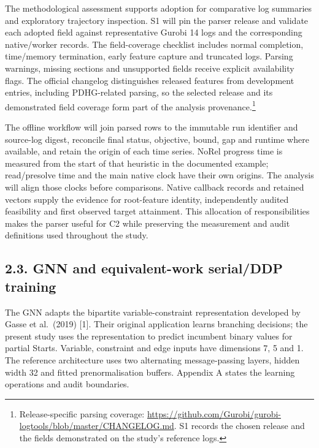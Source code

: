 \documentclass[
  british,
  10pt,
]{article}
\begin{document}
The methodological assessment supports adoption for comparative log
summaries and exploratory trajectory inspection. S1 will pin the parser
release and validate each adopted field against representative Gurobi 14
logs and the corresponding native/worker records. The field-coverage
checklist includes normal completion, time/memory termination, early
feature capture and truncated logs. Parsing warnings, missing sections
and unsupported fields receive explicit availability flags. The official
changelog distinguishes released features from development entries,
including PDHG-related parsing, so the selected release and its
demonstrated field coverage form part of the analysis
provenance.\footnote{Release-specific parsing coverage:
  \url{https://github.com/Gurobi/gurobi-logtools/blob/master/CHANGELOG.md}.
  S1 records the chosen release and the fields demonstrated on the
  study's reference logs.}

The offline workflow will join parsed rows to the immutable run
identifier and source-log digest, reconcile final status, objective,
bound, gap and runtime where available, and retain the origin of each
time series. NoRel progress time is measured from the start of that
heuristic in the documented example; read/presolve time and the main
native clock have their own origins. The analysis will align those
clocks before comparisons. Native callback records and retained vectors
supply the evidence for root-feature identity, independently audited
feasibility and first observed target attainment. This allocation of
responsibilities makes the parser useful for C2 while preserving the
measurement and audit definitions used throughout the study.

\subsection{2.3. GNN and equivalent-work serial/DDP
training}\label{gnn-and-equivalent-work-serialddp-training}

The GNN adapts the bipartite variable-constraint representation
developed by Gasse et al.~(2019) {[}1{]}. Their original application
learns branching decisions; the present study uses the representation to
predict incumbent binary values for partial Starts. Variable, constraint
and edge inputs have dimensions 7, 5 and 1. The reference architecture
uses two alternating message-passing layers, hidden width 32 and fitted
prenormalisation buffers. Appendix A states the learning operations and
audit boundaries.
\end{document}
